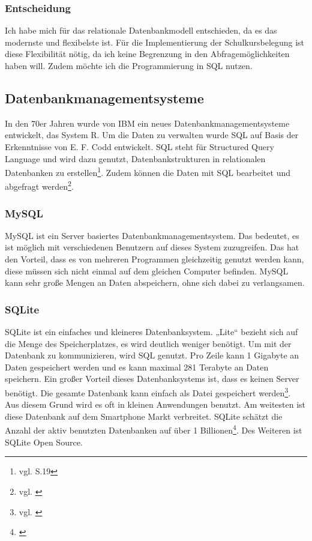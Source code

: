 \documentclass[a4paper, 12pt]{article}
\theoremstyle{plain}
\theoremstyle{definition}
\begin{document}
	\subsubsection{Entscheidung}
	Ich habe mich für das relationale Datenbankmodell entschieden, da es das modernste und flexibelste ist. Für die Implementierung der Schulkursbelegung ist diese Flexibilität nötig, da ich keine Begrenzung in den Abfragemöglichkeiten haben will. Zudem möchte ich die Programmierung in SQL nutzen. 
	
	\subsection{Datenbankmanagementsysteme}
	\label{sec:dbArten}
	In den 70er Jahren wurde von IBM ein neues Datenbankmanagementsysteme entwickelt, das System R. Um die Daten zu verwalten wurde SQL auf Basis der Erkenntnisse von E. F. Codd entwickelt. SQL steht für \glqq Structured Query Language\grqq{} und wird dazu genutzt, Datenbankstrukturen in relationalen Datenbanken zu erstellen\footnote{vgl. \cite{laube19} S.19}. Zudem können die Daten mit SQL bearbeitet und abgefragt werden\footnote{vgl. \cite{SQLver}}. 
	
	\subsubsection{MySQL}
	\label{sec:MySQL}
	MySQL ist ein Server basiertes Datenbankmanagementsystem. Das bedeutet, es ist möglich mit verschiedenen Benutzern auf dieses System zuzugreifen. Das hat den Vorteil, dass es von mehreren Programmen gleichzeitig genutzt werden kann, diese müssen sich nicht einmal auf dem gleichen Computer befinden. MySQL kann sehr große Mengen an Daten abspeichern, ohne sich dabei zu verlangsamen.
	
	\subsubsection{SQLite}
	\label{sec:SQLite}
	SQLite ist ein einfaches und kleineres Datenbanksystem.  „Lite“ bezieht sich auf die Menge des Speicherplatzes, es wird deutlich weniger benötigt. Um mit der Datenbank zu kommunizieren, wird SQL genutzt. Pro Zeile kann 1 Gigabyte an Daten gespeichert werden und es kann maximal 281 Terabyte an Daten speichern. Ein großer Vorteil dieses Datenbanksystems ist, dass es keinen Server benötigt. Die gesamte Datenbank kann einfach als Datei gespeichert werden\footnote{vgl. \cite{SQLite}}. Aus diesem Grund wird es oft in kleinen Anwendungen benutzt. Am weitesten ist diese Datenbank auf dem Smartphone Markt verbreitet. SQLite schätzt die Anzahl der aktiv benutzten Datenbanken auf über 1 Billionen\footnote{\cite{SQLiteUser}}. Des Weiteren ist SQLite Open Source.
	
\end{document}
